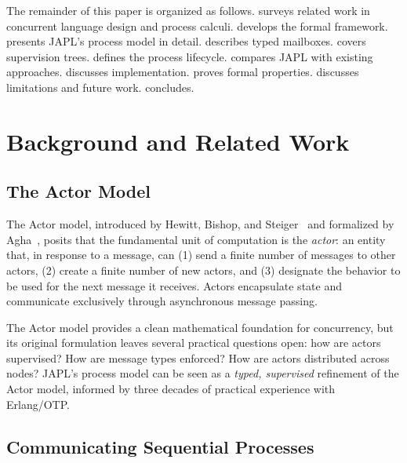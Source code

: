 \documentclass[11pt,a4paper]{article}
\begin{document}
The remainder of this paper is organized as follows.  surveys related work in concurrent language design and process calculi.  develops the formal framework.  presents JAPL's process model in detail.  describes typed mailboxes.  covers supervision trees.  defines the process lifecycle.  compares JAPL with existing approaches.  discusses implementation.  proves formal properties.  discusses limitations and future work.  concludes.


\section{Background and Related Work}\label{sec:background}

\subsection{The Actor Model}

The Actor model, introduced by Hewitt, Bishop, and Steiger~\citep{hewitt1973universal} and formalized by Agha~\citep{agha1986actors}, posits that the fundamental unit of computation is the \emph{actor}: an entity that, in response to a message, can (1) send a finite number of messages to other actors, (2) create a finite number of new actors, and (3) designate the behavior to be used for the next message it receives. Actors encapsulate state and communicate exclusively through asynchronous message passing.

The Actor model provides a clean mathematical foundation for concurrency, but its original formulation leaves several practical questions open: how are actors supervised? How are message types enforced? How are actors distributed across nodes? JAPL's process model can be seen as a \emph{typed, supervised} refinement of the Actor model, informed by three decades of practical experience with Erlang/OTP.

\subsection{Communicating Sequential Processes}
\end{document}
